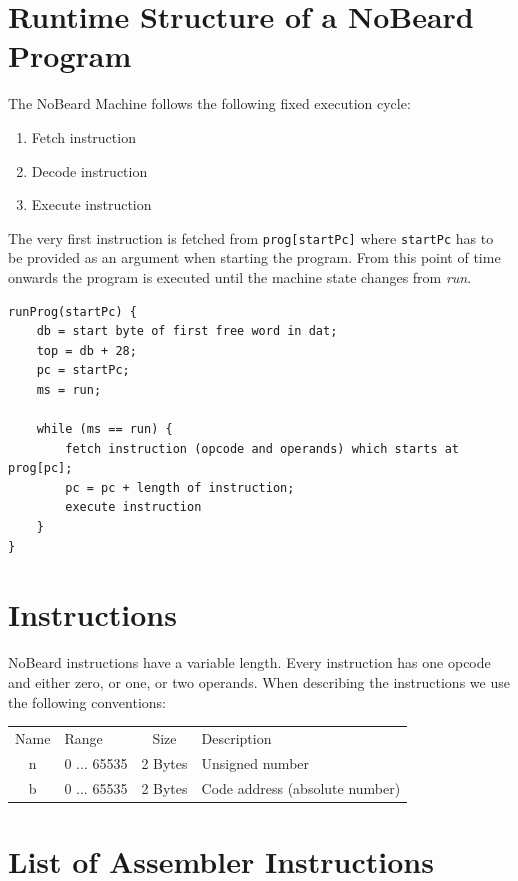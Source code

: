 \documentclass[11pt]{report}
\newcommand{\leongage}{NoBeard}
\begin{document}
\section{Runtime Structure of a \leongage{} Program}
The \leongage{} Machine follows the following fixed execution cycle:
\begin{enumerate}
	\item Fetch instruction
	\item Decode instruction
	\item Execute instruction
\end{enumerate}
The very first instruction is fetched from {\tt prog[startPc]} where {\tt startPc} has to be provided as an argument when starting the program. From this point of time onwards the program is executed until the machine state changes from {\em run}.

\lstset{language=Java, tabsize=2}
\begin{lstlisting}
runProg(startPc) {
	db = start byte of first free word in dat;
	top = db + 28;
	pc = startPc;
	ms = run;
	
	while (ms == run) {
		fetch instruction (opcode and operands) which starts at prog[pc];
		pc = pc + length of instruction;
		execute instruction
	}
}
\end{lstlisting}

\section{Instructions}
\leongage{} instructions have a variable length. Every instruction has one opcode and either zero, or one, or two operands. When describing the instructions we use the following conventions:

\begin{tabular}{clcl}
Name & Range & Size & Description \\
n & 0 ... 65535 & 2 Bytes & Unsigned number \\
b & 0 ... 65535 & 2 Bytes & Code address (absolute number)
\end{tabular}
\section{List of Assembler Instructions}
\lstset{language=[x86masm]Assembler, tabsize=2, basicstyle=\footnotesize}
\end{document}

